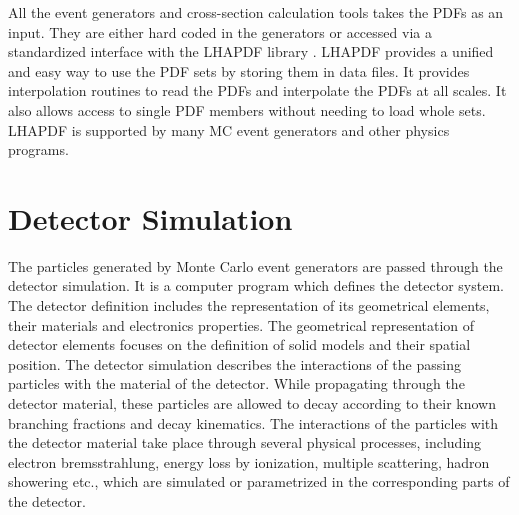 All the event generators and cross-section calculation tools takes the PDFs as an input. They are either hard coded in the generators or accessed via a standardized interface with the LHAPDF library \cite{Whalley:2005nh,Buckley:2014ana}. LHAPDF provides a unified and easy way to use the PDF sets by storing them in data files. It provides interpolation routines to read the PDFs and interpolate the PDFs at all scales. It also allows access to single PDF members without needing to load whole sets. LHAPDF is supported by many MC event generators and other physics programs.

\section{Detector Simulation}
The particles generated by Monte Carlo event generators are passed through the detector simulation. It is a computer program which defines the detector system. The detector definition includes the representation of its geometrical elements, their materials and electronics properties. The geometrical representation of detector elements focuses on the definition of solid models and their spatial position. The detector simulation describes the interactions of the passing particles with the material of the detector. While propagating through the detector material, these particles are allowed to decay according to their known branching fractions and decay kinematics. The interactions of the particles with the detector material take place through several physical processes, including electron bremsstrahlung, energy loss by ionization, multiple scattering, hadron showering etc., which are simulated or parametrized in the corresponding parts of the detector. 

